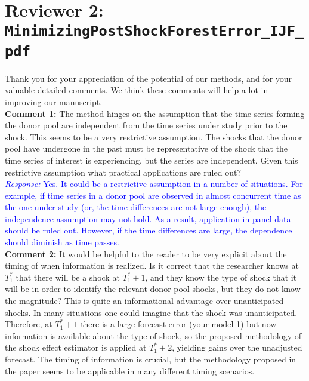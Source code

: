 \documentclass[12pt]{article}
\newcommand{\response}[1]{\noindent \textcolor{blue}{\emph{Response:} #1}}
\begin{document}
\newpage

\section*{Reviewer 2:  \texttt{MinimizingPostShockForestError\_IJF\_pdf}}

Thank you for your appreciation of the potential of our methods, and for your valuable detailed comments.  We think these comments will help a lot in improving our manuscript.\\

{\bf Comment 1:} The method hinges on the assumption that the time series forming the donor pool are independent from the time series under study prior to the shock. This seems to be a very restrictive assumption. The shocks that the donor pool have undergone in the past must be representative of the shock that the time series of interest is experiencing, but the series are independent. Given this restrictive assumption what practical applications are ruled out? \\

\response{Yes. It could be a restrictive assumption in a number of situations. For example, if time series in a donor pool are observed in almost concurrent time as the one under study (or, the time differences are not large enough), the independence assumption may not hold. As a result, application in panel data should be ruled out. However, if the time differences are large, the dependence should diminish as time passes.} \\

{\bf Comment 2:} It would be helpful to the reader to be very explicit about the timing of when information is realized. Is it correct that the researcher knows at $T_1^*$ that there will be a shock at $T_1^* + 1$, and they know the type of shock that it will be in order to identify the relevant donor pool shocks, but they do not know the magnitude? This is quite an informational advantage over unanticipated shocks. In many situations one could imagine that the shock was unanticipated. Therefore, at $T_1^* + 1$  there is a large forecast error (your model 1) but now information is available about the type of shock, so the proposed methodology of the shock effect estimator is applied at $T_1^* + 2$, yielding gains over the unadjusted forecast. The timing of information is crucial, but the methodology proposed in the paper seems to be applicable in many different timing scenarios. \\
\end{document}
